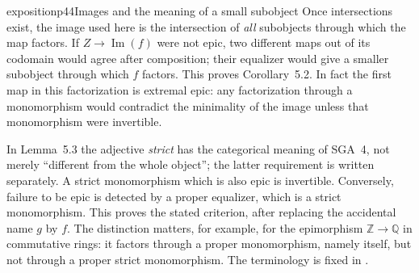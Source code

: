 \begin{dcomment}{exposition}{p44}{Images and the meaning of a small subobject}
Once intersections exist, the image used here is the intersection of \emph{all} subobjects through which the map factors. If $Z\to\operatorname{Im}(f)$ were not epic, two different maps out of its codomain would agree after composition; their equalizer would give a smaller subobject through which $f$ factors. This proves Corollary~5.2. In fact the first map in this factorization is extremal epic: any factorization through a monomorphism would contradict the minimality of the image unless that monomorphism were invertible.

In Lemma~5.3 the adjective \emph{strict} has the categorical meaning of SGA~4, not merely ``different from the whole object''; the latter requirement is written separately. A strict monomorphism which is also epic is invertible. Conversely, failure to be epic is detected by a proper equalizer, which is a strict monomorphism. This proves the stated criterion, after replacing the accidental name $g$ by $f$. The distinction matters, for example, for the epimorphism $\mathbb Z\to\mathbb Q$ in commutative rings: it factors through a proper monomorphism, namely itself, but not through a proper strict monomorphism. The terminology is fixed in \citep[Expos\'e~I, 10.2--10.5]{SGA4I1972}.
\end{dcomment}

